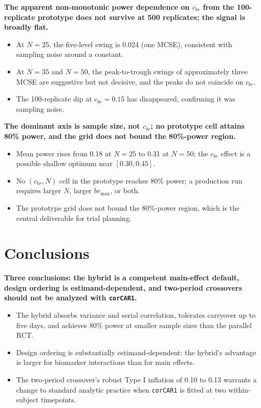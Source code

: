 \documentclass[
  11pt,
]{article}
\begin{document}
\textbf{The apparent non-monotonic power dependence on $c_{br}$ from the 100-replicate prototype does not survive at 500 replicates; the signal is broadly flat.}

\begin{itemize}\setlength{\itemsep}{2pt}\setlength{\parskip}{0pt}
\item At $N = 25$, the five-level swing is 0.024 (one MCSE), consistent with sampling noise around a constant.
\item At $N = 35$ and $N = 50$, the peak-to-trough swings of approximately three MCSE are suggestive but not decisive, and the peaks do not coincide on $c_{br}$.
\item The 100-replicate dip at $c_{br} = 0.15$ has disappeared, confirming it was sampling noise.
\end{itemize}

\textbf{The dominant axis is sample size, not $c_{br}$; no prototype cell attains 80\% power, and the grid does not bound the 80\%-power region.}

\begin{itemize}\setlength{\itemsep}{2pt}\setlength{\parskip}{0pt}
\item Mean power rises from 0.18 at $N = 25$ to 0.31 at $N = 50$; the $c_{br}$ effect is a possible shallow optimum near $[0.30, 0.45]$.
\item No $(c_{br}, N)$ cell in the prototype reaches 80\% power; a production run requires larger $N$, larger $br_{\max}$, or both.
\item The prototype grid does not bound the 80\%-power region, which is the central deliverable for trial planning.
\end{itemize}

\section{Conclusions}\label{conclusions}

\textbf{Three conclusions: the hybrid is a competent main-effect default, design ordering is estimand-dependent, and two-period crossovers should not be analyzed with \texttt{corCAR1}.}

\begin{itemize}\setlength{\itemsep}{2pt}\setlength{\parskip}{0pt}
\item The hybrid absorbs variance and serial correlation, tolerates carryover up to five days, and achieves 80\% power at smaller sample sizes than the parallel RCT.
\item Design ordering is substantially estimand-dependent: the hybrid's advantage is larger for biomarker interactions than for main effects.
\item The two-period crossover's robust Type I inflation of 0.10 to 0.13 warrants a change to standard analytic practice when \texttt{corCAR1} is fitted at two within-subject timepoints.
\end{itemize}
\end{document}
